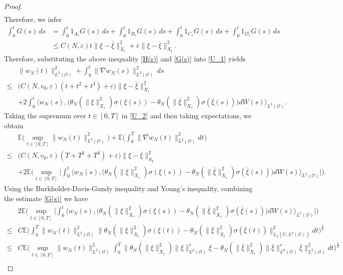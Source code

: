 \documentclass[reqno, 11pt]{amsart}
\theoremstyle{definition}
\numberwithin{equation}{section} \numberwithin{lem}{section}
\numberwithin{thm}{section} \numberwithin{prop}{section}
\numberwithin{cor}{section} \numberwithin{rem}{section}
\numberwithin{defn}{section}
\begin{document}
\begin{proof}
\begin{align*}
\end{align*}
Therefore, we infer
\begin{align}\label{G(s)}
\nonumber\int_0^tG(s)\,ds&=\int_0^t1_{A_s}G(s)\,ds+\int_0^t1_{B_s}G(s)\,ds+\int_0^t1_{C_s}G(s)\,ds+\int_0^t1_{D_s}G(s)\,ds\\&\le C(N,\varepsilon)t\|\xi-\bar \xi\|_{X_t}^2+\varepsilon\|\xi-\bar \xi\|_{X_t}^2.
\end{align}
Therefore, substituting the above inequality \eqref{H(s)} and \eqref{G(s)} into \eqref{U_1} yields
\begin{align}\label{U_2}
&\nonumber\|{w_N}(t)\|_{L^2(\mathcal {O})}^2+\int_0^t\|\nabla {w_N}(s)\|_{L^2(\mathcal {O})}^2\,ds\\
\nonumber\le &\big(C(N,v_0,\varepsilon)(t+t^2+t^3)+\varepsilon\big)\|\xi-\bar \xi\|_{X_t}^2\\&+2\int_0^t\big\langle
{w_N}(s),\big(\theta_N(\|\xi\|_{X_s}^2)\sigma(\xi(s))-\theta_N(\|\bar \xi\|_{X_s}^2)\sigma(\bar \xi(s) )\big)dW(s)\big\rangle_{L^2(\mathcal {O})}.
\end{align}
  Taking the supremum over \(t\in[0,T]\) in \eqref{U_2} and then taking
expectations, we obtain
    \begin{align}\label{EU}
\nonumber&\mathbb{E}\big(\sup_{t\in[0,T]}\|{w_N}(t)\|_{L^2(\mathcal {O})}^2\big)+\mathbb{E}\Big(\int_0^T\|\nabla {w_N}(t)\|_{L^2(\mathcal {O})}^2dt\Big)\\
    \nonumber\le &\big(C(N,v_0,\varepsilon)(T+T^2+T^3)+\varepsilon\big)\|\xi-\bar \xi\|_{S_T}^2\\
&+2\mathbb{E}\Big(\sup_{t\in[0,T]}\Big|\int_0^t\big\langle {w_N}(s),\big(\theta_N(\|\xi\|_{X_s}^2)\sigma(\xi(s))-\theta_N(\|\bar \xi\|_{X_s}^2)\sigma(\bar \xi(s) )\big)dW(s)\big\rangle_{L^2(\mathcal {O})}\Big|\Big).
    \end{align}
    Using the Burkholder-Davis-Gundy inequality and Young's inequality, combining the estimate \eqref{G(s)} we have
    \begin{align*}
        &2\mathbb{E}\Big(\sup_{t\in[0,T]}\Big|\int_0^t\big\langle {w_N}(s),\big(\theta_N(\|\xi\|_{X_s}^2)\sigma(\xi(s))-\theta_N(\|\bar \xi\|_{X_s}^2)\sigma(\bar \xi(s) )\big)dW(s)\big\rangle_{L^2(\mathcal {O})}\Big|\Big)\\\le&C \mathbb{E}\Big(\int_0^T\|{w_N}(t)\|_{L^2(\mathcal {O})}^2\|\theta_N(\|\xi\|_{X_t}^2)\sigma(\xi(t))-\theta_N(\|\bar \xi\|_{X_t}^2)\sigma(\bar \xi(t) )\|_{L_2(U,{L^2(\mathcal {O})})}^2dt\Big)^\frac{1}{2}\\
        \le &C\mathbb{E}\Big(\sup_{t\in[0,T]}\|{w_N}(t)\|_{L^2(\mathcal {O})}^2\int_0^T\big\|\theta_N(\|\xi\|_{X_t}^2)\|\xi\|_{L^p(\mathcal O)}^r \xi-\theta_N(\|\bar \xi\|_{X_t}^2)\|\bar \xi \|_{L^p(\mathcal O)}^r \bar \xi\big\|_{L^2(\mathcal O)}^2dt\Big)^\frac{1}{2}\\

\end{align*}
\end{proof}
\end{document}
